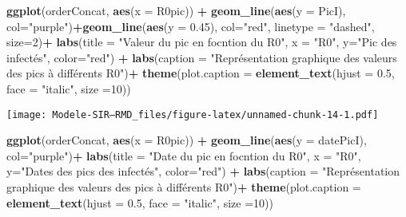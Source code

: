 \documentclass[
]{article}
\newenvironment{Shaded}{\begin{snugshade}}{\end{snugshade}}
\newcommand{\DataTypeTok}[1]{\textcolor[rgb]{0.13,0.29,0.53}{#1}}
\newcommand{\DecValTok}[1]{\textcolor[rgb]{0.00,0.00,0.81}{#1}}
\newcommand{\FloatTok}[1]{\textcolor[rgb]{0.00,0.00,0.81}{#1}}
\newcommand{\KeywordTok}[1]{\textcolor[rgb]{0.13,0.29,0.53}{\textbf{#1}}}
\newcommand{\NormalTok}[1]{#1}
\newcommand{\OperatorTok}[1]{\textcolor[rgb]{0.81,0.36,0.00}{\textbf{#1}}}
\newcommand{\StringTok}[1]{\textcolor[rgb]{0.31,0.60,0.02}{#1}}
\begin{document}
\begin{Shaded}
\begin{Highlighting}[]
\KeywordTok{ggplot}\NormalTok{(orderConcat, }\KeywordTok{aes}\NormalTok{(}\DataTypeTok{x =}\NormalTok{ R0pic)) }\OperatorTok{+}\StringTok{ }\KeywordTok{geom_line}\NormalTok{(}\KeywordTok{aes}\NormalTok{(}\DataTypeTok{y =}\NormalTok{ PicI), }\DataTypeTok{col=}\StringTok{"purple"}\NormalTok{)}\OperatorTok{+}\KeywordTok{geom_line}\NormalTok{(}\KeywordTok{aes}\NormalTok{(}\DataTypeTok{y =} \FloatTok{0.45}\NormalTok{), }\DataTypeTok{col=}\StringTok{"red"}\NormalTok{, }\DataTypeTok{linetype =} \StringTok{"dashed"}\NormalTok{, }\DataTypeTok{size=}\DecValTok{2}\NormalTok{)}\OperatorTok{+}\StringTok{ }\KeywordTok{labs}\NormalTok{(}\DataTypeTok{title =} \StringTok{"Valeur du pic en focntion du R0"}\NormalTok{, }\DataTypeTok{x =} \StringTok{"R0"}\NormalTok{, }\DataTypeTok{y=}\StringTok{"Pic des infectés"}\NormalTok{, }\DataTypeTok{color=}\StringTok{"red"}\NormalTok{) }\OperatorTok{+}\StringTok{ }\KeywordTok{labs}\NormalTok{(}\DataTypeTok{caption =} \StringTok{"Représentation graphique des valeurs des pics à différents R0"}\NormalTok{)}\OperatorTok{+}\StringTok{ }\KeywordTok{theme}\NormalTok{(}\DataTypeTok{plot.caption =} \KeywordTok{element_text}\NormalTok{(}\DataTypeTok{hjust =} \FloatTok{0.5}\NormalTok{, }\DataTypeTok{face =} \StringTok{"italic"}\NormalTok{, }\DataTypeTok{size =}\DecValTok{10}\NormalTok{))}
\end{Highlighting}
\end{Shaded}

\texttt{[image: Modele-SIR---RMD\_files/figure-latex/unnamed-chunk-14-1.pdf]}

\begin{Shaded}
\begin{Highlighting}[]
 \KeywordTok{ggplot}\NormalTok{(orderConcat, }\KeywordTok{aes}\NormalTok{(}\DataTypeTok{x =}\NormalTok{ R0pic)) }\OperatorTok{+}\StringTok{ }\KeywordTok{geom_line}\NormalTok{(}\KeywordTok{aes}\NormalTok{(}\DataTypeTok{y =}\NormalTok{ datePicI), }\DataTypeTok{col=}\StringTok{"purple"}\NormalTok{)}\OperatorTok{+}\StringTok{ }\KeywordTok{labs}\NormalTok{(}\DataTypeTok{title =} \StringTok{"Date du pic en focntion du R0"}\NormalTok{, }\DataTypeTok{x =} \StringTok{"R0"}\NormalTok{, }\DataTypeTok{y=}\StringTok{"Dates des pics des infectés"}\NormalTok{, }\DataTypeTok{color=}\StringTok{"red"}\NormalTok{) }\OperatorTok{+}\StringTok{ }\KeywordTok{labs}\NormalTok{(}\DataTypeTok{caption =} \StringTok{"Représentation graphique des valeurs des pics à différents R0"}\NormalTok{)}\OperatorTok{+}\StringTok{ }\KeywordTok{theme}\NormalTok{(}\DataTypeTok{plot.caption =} \KeywordTok{element_text}\NormalTok{(}\DataTypeTok{hjust =} \FloatTok{0.5}\NormalTok{, }\DataTypeTok{face =} \StringTok{"italic"}\NormalTok{, }\DataTypeTok{size =}\DecValTok{10}\NormalTok{))}
\end{Highlighting}
\end{Shaded}
\end{document}
